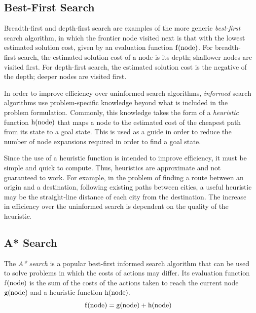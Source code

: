 \subsection{Best-First Search}

Breadth-first and depth-first search are examples of the more generic \emph{best-first} search algorithm, in which the frontier node visited next is that with the lowest estimated solution cost, given by an evaluation function \( \mathrm{f}\!\left( \text{node} \right) \).
For breadth-first search, the estimated solution cost of a node is its depth; shallower nodes are visited first.
For depth-first search, the estimated solution cost is the negative of the depth; deeper nodes are visited first.

In order to improve efficiency over uninformed search algorithms, \emph{informed} search algorithms use problem-specific knowledge beyond what is included in the problem formulation.
Commonly, this knowledge takes the form of a \emph{heuristic} function \( \mathrm{h}\!\left( \text{node} \right) \) that maps a node to the estimated cost of the cheapest path from its state to a goal state.
This is used as a guide in order to reduce the number of node expansions required in order to find a goal state.

Since the use of a heuristic function is intended to improve efficiency, it must be simple and quick to compute.
Thus, heuristics are approximate and not guaranteed to work.
For example, in the problem of finding a route between an origin and a destination, following existing paths between cities, a useful heuristic may be the straight-line distance of each city from the destination.
The increase in efficiency over the uninformed search is dependent on the quality of the heuristic.

\subsection{A* Search}

The \emph{A* search} is a popular best-first informed search algorithm that can be used to solve problems in which the costs of actions may differ.
Its evaluation function \( \mathrm{f}\!\left( \text{node} \right) \) is the sum of the costs of the actions taken to reach the current node \( \mathrm{g}\!\left( \text{node} \right) \) and a heuristic function \( \mathrm{h}\!\left( \text{node} \right) \).
\begin{equation*}
  \mathrm{f}\!\left( \text{node} \right) = \mathrm{g}\!\left( \text{node} \right) + \mathrm{h}\!\left( \text{node} \right)
\end{equation*}

